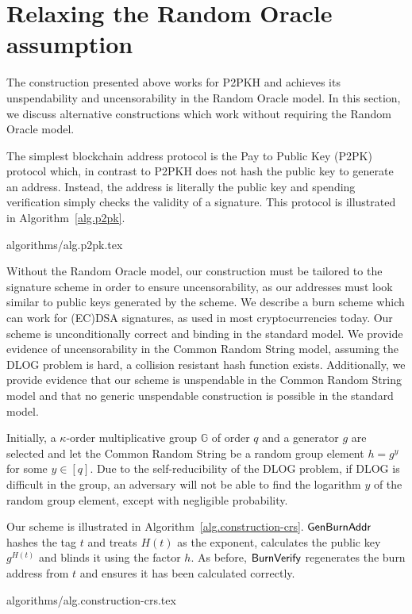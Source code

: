 \section{Relaxing the Random Oracle assumption}\label{sec:standard}

The construction presented above works for P2PKH and achieves its unspendability and uncensorability in the Random Oracle model. In this section, we discuss alternative constructions which work without requiring the Random Oracle model.

The simplest blockchain address protocol is the Pay to Public Key (P2PK) protocol which, in contrast to P2PKH does not hash the public key to generate an address. Instead, the address is literally the public key and spending verification simply checks the validity of a signature. This protocol is illustrated in Algorithm~\ref{alg.p2pk}.

{algorithms/alg.p2pk.tex}

Without the Random Oracle model, our construction must be tailored to the signature scheme in order to ensure uncensorability, as our addresses must look similar to public keys generated by the scheme. We describe a burn scheme which can work for (EC)DSA signatures, as used in most cryptocurrencies today. Our scheme is unconditionally correct and binding in the standard model. We provide evidence of uncensorability in the Common Random String model, assuming the DLOG problem is hard, a collision resistant hash function exists. Additionally, we provide evidence that our scheme is unspendable in the Common Random String model and that no generic unspendable construction is possible in the standard model.

Initially, a $\kappa$-order multiplicative group $\mathbb{G}$ of order $q$ and a generator $g$ are selected and let the Common Random String be a random group element $h = g^y$ for some $y \in [q]$. Due to the self-reducibility of the DLOG problem, if DLOG is difficult in the group, an adversary will not be able to find the logarithm $y$ of the random group element, except with negligible probability.

Our scheme is illustrated in Algorithm~\ref{alg.construction-crs}. $\mathsf{Gen}\-\mathsf{Burn}\-\mathsf{Addr}$ hashes the tag $t$ and treats $H(t)$ as the exponent, calculates the public key $g^{H(t)}$ and blinds it using the factor $h$. As before, $\mathsf{BurnVerify}$ regenerates the burn address from $t$ and ensures it has been calculated correctly.

{algorithms/alg.construction-crs.tex}

